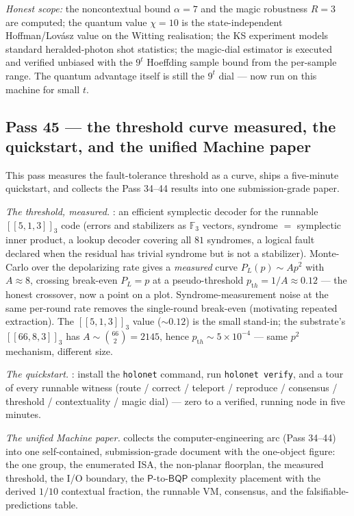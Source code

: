 \documentclass[11pt]{article}
\begin{document}
\emph{Honest scope:} the noncontextual bound $\alpha=7$ and the magic robustness $R=3$ are computed; the
quantum value $\chi=10$ is the state-independent Hoffman/Lov\'asz value on the Witting realisation; the
KS experiment models standard heralded-photon shot statistics; the magic-dial estimator is executed and
verified unbiased with the $9^t$ Hoeffding sample bound from the per-sample range. The quantum advantage
itself is still the $9^t$ dial --- now run on this machine for small $t$.

\subsection{Pass 45 --- the threshold curve measured, the quickstart, and the unified Machine paper}
\label{sec:capstone-fortyfive}

This pass measures the fault-tolerance threshold as a curve, ships a five-minute quickstart, and
collects the Pass 34--44 results into one submission-grade paper.

\emph{The threshold, measured.} : an efficient symplectic
decoder for the runnable $[[5,1,3]]_3$ code (errors and stabilizers as $\mathbb{F}_3$ vectors, syndrome
$=$ symplectic inner product, a lookup decoder covering all $81$ syndromes, a logical fault declared
when the residual has trivial syndrome but is not a stabilizer). Monte-Carlo over the depolarizing rate
gives a \emph{measured} curve $P_L(p)\sim A p^2$ with $A\approx8$, crossing break-even $P_L=p$ at a
pseudo-threshold $p_{\mathrm th}=1/A\approx0.12$ --- the honest crossover, now a point on a plot.
Syndrome-measurement noise at the same per-round rate removes the single-round break-even (motivating
repeated extraction). The $[[5,1,3]]_3$ value ($\sim0.12$) is the small stand-in; the substrate's
$[[66,8,3]]_3$ has $A\sim\binom{66}{2}=2145$, hence $p_{\mathrm th}\sim5\times10^{-4}$ --- same $p^2$
mechanism, different size.

\emph{The quickstart.} : install the \texttt{holonet} command, run \texttt{holonet
verify}, and a tour of every runnable witness (route / correct / teleport / reproduce / consensus /
threshold / contextuality / magic dial) --- zero to a verified, running node in five minutes.

\emph{The unified Machine paper.}  collects the computer-engineering arc
(Pass 34--44) into one self-contained, submission-grade document with the one-object figure: the one
group, the enumerated ISA, the non-planar floorplan, the measured threshold, the I/O boundary, the
$\mathsf{P}$-to-$\mathsf{BQP}$ complexity placement with the derived $1/10$ contextual fraction, the
runnable VM, consensus, and the falsifiable-predictions table.
\end{document}
